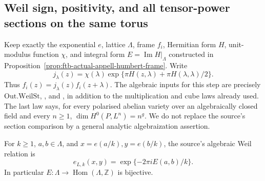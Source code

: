 \subsection{Weil sign, positivity, and all tensor-power sections on the same torus}
\label{subsec:ftb-complex-weil-sections}

Keep exactly the exponential \(e\), lattice \(\Lambda\), frame \(f_i\),
Hermitian form \(H\), unit-modulus function \(\chi\), and integral form
\(E=\operatorname{Im}H|_\Lambda\) constructed in
Proposition~\ref{prop:ftb-actual-appell-humbert-frame}.
Write
\[
 j_\lambda(z)=\chi(\lambda)
       \exp\{\pi H(z,\lambda)+\pi H(\lambda,\lambda)/2\}.
\]
Thus \(f_i(z)=j_\lambda(z)f_i(z+\lambda)\).
The algebraic inputs for this step are precisely
\(\mathrm{Out.WeilSt}\), , and
, in addition to the
multiplication and cube laws already used.
The last law says, for every polarised abelian variety over an
algebraically closed field and every \(n\geq1\),
\(\dim H^0(P,L^n)=n^g\).
We do not replace the source's section comparison by a general
analytic algebraization assertion.

\begin{srlemma}
\label{lem:ftb-complex-weil-sign}
For \(k\geq1\), \(a,b\in\Lambda\), and
\(x=e(a/k),y=e(b/k)\), the source's algebraic Weil relation is
\[
                 e_{L,k}(x,y)=
                  \exp\{-2\pi i E(a,b)/k\}.                \tag{CW1}
\]
In particular \(E:\Lambda\to\operatorname{Hom}(\Lambda,\mathbb Z)\)
is bijective.
\end{srlemma}

